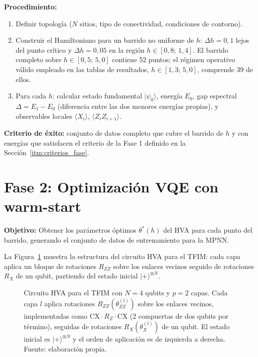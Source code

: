 \documentclass[11pt,a4paper,spanish]{book}
\begin{document}
\textbf{Procedimiento:}
\begin{enumerate}
    \item Definir topología ($N$ sitios, tipo de conectividad, condiciones de contorno).
    \item Construir el Hamiltoniano para un barrido no uniforme de $h$: $\Delta h = 0,1$ lejos del punto crítico y $\Delta h = 0,05$ en la región $h \in [0{,}8;\, 1{,}4]$. El barrido completo sobre $h \in [0{,}5;\, 5{,}0]$ contiene 52 puntos; el régimen operativo válido empleado en las tablas de resultados, $h \in [1{,}3;\, 5{,}0]$, comprende 39 de ellos.
    \item Para cada $h$: calcular estado fundamental $|\psi_0\rangle$, energía $E_0$, gap espectral $\Delta = E_1 - E_0$ (diferencia entre las dos menores energías propias), y observables locales $\langle X_i \rangle$, $\langle Z_i Z_{i+1} \rangle$.
\end{enumerate}

\textbf{Criterio de éxito:} conjunto de datos completo que cubre el barrido de $h$ y con energías que satisfacen el criterio de la Fase 1 definido en la Sección~\ref{itm:criterios_fase}.

\section{Fase 2: Optimización VQE con warm-start}
\label{sec:fase2}

\textbf{Objetivo:} Obtener los parámetros óptimos $\theta^*(h)$ del HVA para cada punto del barrido, generando el conjunto de datos de entrenamiento para la MPNN.

La Figura~\ref{fig:hva_circuit} muestra la estructura del circuito HVA para el TFIM: cada capa aplica un bloque de rotaciones $R_{ZZ}$ sobre los enlaces vecinos seguido de rotaciones $R_X$ de un qubit, partiendo del estado inicial $|{+}\rangle^{\otimes N}$.

\begin{figure}[H]
\centering
\bgroup\shorthandoff{<>}
\resizebox{0.95\textwidth}{!}{}
\egroup
\caption[Circuito HVA para el TFIM ($N = 4$, $p = 2$)]{Circuito HVA para el TFIM con $N = 4$ qubits y $p = 2$ capas. Cada capa $l$ aplica rotaciones $R_{ZZ}(\theta_{ZZ}^{(l)})$ sobre los enlaces vecinos, implementadas como $\mathrm{CX}\cdot R_Z\cdot\mathrm{CX}$ (2 compuertas de dos qubits por término), seguidas de rotaciones $R_X(\theta_X^{(l)})$ de un qubit. El estado inicial es $|{+}\rangle^{\otimes N}$ y el orden de aplicación es de izquierda a derecha. Fuente: elaboración propia.}
\label{fig:hva_circuit}
\end{figure}
\end{document}
